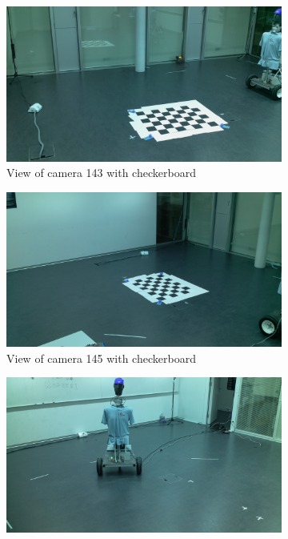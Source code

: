 \begin{figure}[H]
    \centering
    \begin{subfigure}{0.49\linewidth}
        \includegraphics[width=\linewidth]{files/res2_image_143.png}
        \caption{View of camera 143 with checkerboard}
    \end{subfigure}
    \begin{subfigure}{0.49\linewidth}
        \includegraphics[width=\linewidth]{files/res2_image_145.png}
        \caption{View of camera 145 with checkerboard}
    \end{subfigure}
    \begin{subfigure}{0.49\linewidth}
        \includegraphics[width=\linewidth]{files/res2_0_image_141.png}

\end{subfigure}
\end{figure}
